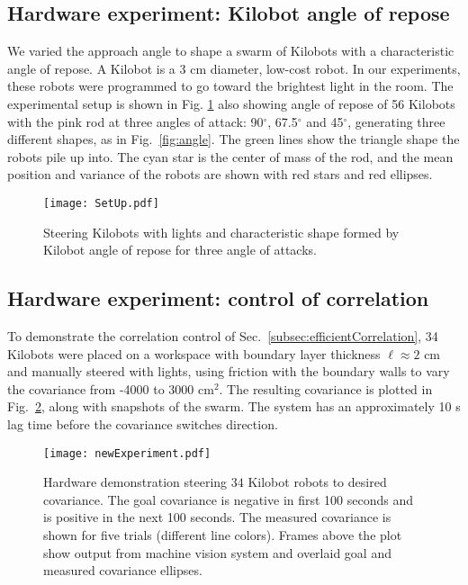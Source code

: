 \subsection{Hardware experiment: Kilobot angle of repose}
We varied the approach angle to shape a swarm of Kilobots \cite{rubenstein2014programmable} with a characteristic angle of repose. 
 A Kilobot is a 3 cm diameter,  low-cost robot. In our experiments, these robots were programmed to go toward the brightest light in the room. The experimental setup is shown in Fig. \ref{fig:SetUp} also showing angle of repose of 56 Kilobots with  the pink rod at three angles of attack: 90$^\circ$, 67.5$^\circ$ and 45$^\circ$, generating three different shapes, as in Fig.~\ref{fig:angle}. The green lines show the triangle shape the robots pile up into. The cyan star is the center of mass of the rod, and the mean position and variance of the robots are shown with red stars and red ellipses.
\begin{figure}
\begin{center}
	\texttt{[image: SetUp.pdf]}
\end{center}
\vspace{-1.5em}
\caption{\label{fig:SetUp}
Steering Kilobots with lights and characteristic shape formed by Kilobot angle of repose for three angle of attacks.
}\vspace{-1.5em}
\end{figure}






\subsection{Hardware experiment: control of correlation}
To demonstrate the correlation control of Sec.~\ref{subsec:efficientCorrelation}, 34 Kilobots were placed on a workspace with boundary layer thickness $\ell \approx 2$ cm and manually steered with lights, using friction with the boundary walls to vary the covariance from  -4000 to 3000 cm$^2$.  The resulting covariance is plotted in Fig.~\ref{fig:covExperiment}, along with snapshots of the swarm. The system has an approximately 10 s lag time before the covariance switches direction.




\begin{figure}[!htb]
\begin{center}
\vspace{-1em}
	\texttt{[image: newExperiment.pdf]}
\end{center}
\vspace{-2em}
\caption{\label{fig:covExperiment}
Hardware demonstration steering $34$ Kilobot robots to desired covariance. The goal covariance is negative in first 100 seconds and is positive in the next 100 seconds. The measured covariance is shown for five trials (different line colors). Frames above the plot show output from machine vision system and overlaid goal and measured covariance ellipses.
\vspace{-1.5 em}
}
\end{figure}

